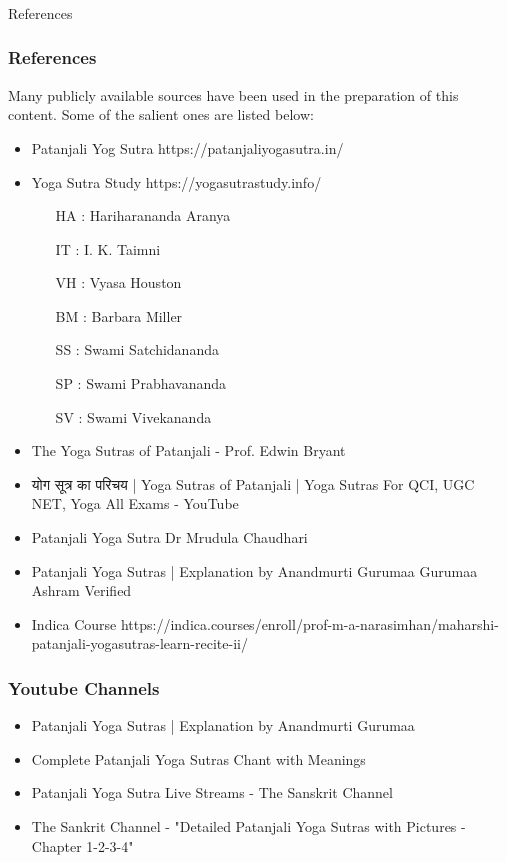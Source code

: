 \begin{frame}[fragile]\frametitle{}
\begin{center}
{\Large References}
\end{center}
\end{frame}


\begin{frame}[fragile]\frametitle{References}

Many publicly available sources have been used in the preparation of this content. Some of the salient ones are listed below:

	\begin{itemize}
	\item Patanjali Yog Sutra https://patanjaliyogasutra.in/
	\item Yoga Sutra Study https://yogasutrastudy.info/
		\begin{itemize}
		\item [HA]: Hariharananda Aranya
		\item [IT]: I. K. Taimni
		\item [VH]: Vyasa Houston
		\item [BM]: Barbara Miller
		\item [SS]: Swami Satchidananda
		\item [SP]: Swami Prabhavananda
		\item [SV]: Swami Vivekananda
		\end{itemize}	
	\item The Yoga Sutras of Patanjali - Prof. Edwin Bryant
	\item योग सूत्र का परिचय | Yoga Sutras of Patanjali | Yoga Sutras For QCI, UGC NET, Yoga All Exams - YouTube
	\item Patanjali Yoga Sutra Dr Mrudula Chaudhari
	\item Patanjali Yoga Sutras | Explanation by Anandmurti Gurumaa Gurumaa Ashram Verified
	\item Indica Course https://indica.courses/enroll/prof-m-a-narasimhan/maharshi-patanjali-yogasutras-learn-recite-ii/
	\end{itemize}

\end{frame}

\begin{frame}[fragile]\frametitle{Youtube Channels}



	\begin{itemize}
	\item Patanjali Yoga Sutras | Explanation by Anandmurti Gurumaa
	\item Complete Patanjali Yoga Sutras Chant with Meanings
	\item Patanjali Yoga Sutra Live Streams - The Sanskrit Channel
	\item The Sankrit Channel - "Detailed Patanjali Yoga Sutras with Pictures - Chapter 1-2-3-4"
	\end{itemize}

\end{frame}

